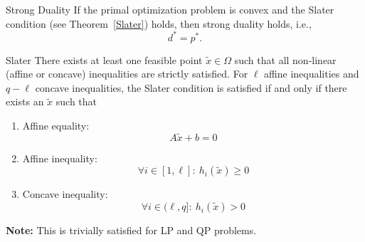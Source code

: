 \newpage

\begin{theo}{Strong Duality}
    If the primal optimization problem is convex and the Slater condition (see Theorem~\ref{Slater}) holds, then strong duality holds, i\@.e\@.,
    \begin{equation*}
        d^* = p^*.
    \end{equation*}
    \vspace*{-0.5cm}
\end{theo}

\begin{theo}{Slater}  
    There exists at least one feasible point $\tilde{x} \in \Omega$ such that all non-linear (affine or concave) inequalities are strictly satisfied. For $\ell$ affine inequalities and $q - \ell$ concave inequalities, the Slater condition is satisfied if and only if there exists an $\tilde{x}$ such that
    \begin{enumerate}
        \item Affine equality: 
        $$
        A\tilde{x} + b = 0
        $$
        \item Affine inequality:
        $$
        \forall i \in [1,\ell]: \ h_i(\tilde{x}) \geq 0
        $$
        \item Concave inequality:
        $$
        \forall i \in (\ell,q]: \  h_i(\tilde{x}) > 0
        $$
    \end{enumerate}
    \textbf{Note:} This is trivially satisfied for LP and QP problems.
\end{theo}


